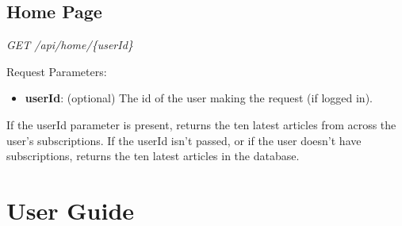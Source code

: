 \documentclass[12pt]{article}
\begin{document}
\begin{appendices}
\subsection{Home Page}

\emph{GET	/api/home/\{userId\}}

Request Parameters:
\begin{itemize}
	\item \textbf{userId}: (optional) The id of the user making the request (if logged in).
\end{itemize}

If the userId parameter is present, returns the ten latest articles from across the user's subscriptions. If the userId isn't passed, or if the user doesn't have subscriptions, returns the ten latest articles in the database.


\newpage

\section{User Guide}

\label{userguide}

\end{appendices}


\end{document}
